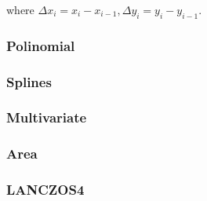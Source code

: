 \documentclass[a4paper,12pt]{article}
\begin{document}
where $ \Delta x_i = x_i - x_{i-1}, \Delta y_i = y_i - y_{i-1}$.


\subsubsection{Polinomial}

\subsubsection{Splines}

\subsubsection{Multivariate}

\subsubsection{Area}

\subsubsection{LANCZOS4}

\newpage


\printbibliography
\end{document}
